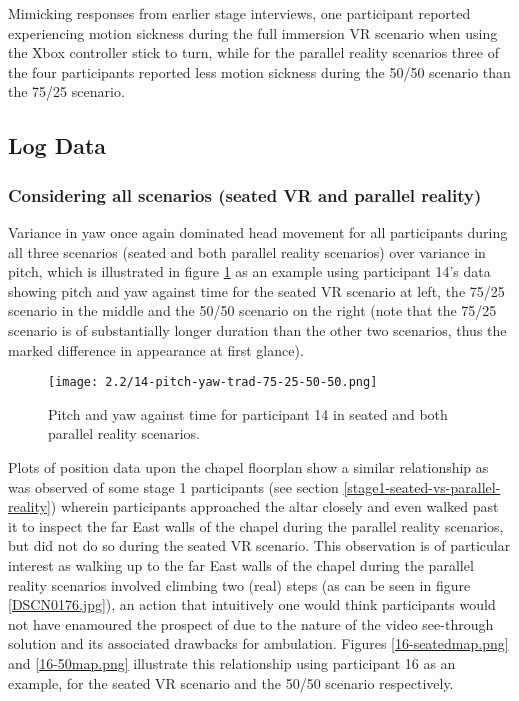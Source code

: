 Mimicking responses from earlier stage interviews, one participant reported experiencing motion sickness during the full immersion VR scenario when using the Xbox controller stick to turn, while for the parallel reality scenarios three of the four participants reported less motion sickness during the 50/50 scenario than the 75/25 scenario.


\subsection{Log Data}

\subsubsection{Considering all scenarios (seated VR and parallel reality)}

Variance in yaw once again dominated head movement for all participants during all three scenarios (seated and both parallel reality scenarios) over variance in pitch, which is illustrated in figure \ref{14-pitch-yaw-trad-75-25-50-50.png} as an example using participant 14's data showing pitch and yaw against time for the seated VR scenario at left, the 75/25 scenario in the middle and the 50/50 scenario on the right (note that the 75/25 scenario is of substantially longer duration than the other two scenarios, thus the marked difference in appearance at first glance).

\begin{figure}
	\begin{center}
	\texttt{[image: 2.2/14-pitch-yaw-trad-75-25-50-50.png]}
	\caption{Pitch and yaw against time for participant 14 in seated and both parallel reality scenarios.}
	\label{14-pitch-yaw-trad-75-25-50-50.png}
	\end{center}
\end{figure}


Plots of position data upon the chapel floorplan show a similar relationship as was observed of some stage 1 participants (see section \ref{stage1-seated-vs-parallel-reality}) wherein participants approached the altar closely and even walked past it to inspect the far East walls of the chapel during the parallel reality scenarios, but did not do so during the seated VR scenario. This observation is of particular interest as walking up to the far East walls of the chapel during the parallel reality scenarios involved climbing two (real) steps (as can be seen in figure \ref{DSCN0176.jpg}), an action that intuitively one would think participants would not have enamoured the prospect of due to the nature of the video see-through solution and its associated drawbacks for ambulation. Figures \ref{16-seatedmap.png} and \ref{16-50map.png} illustrate this relationship using participant 16 as an example, for the seated VR scenario and the 50/50 scenario respectively.

